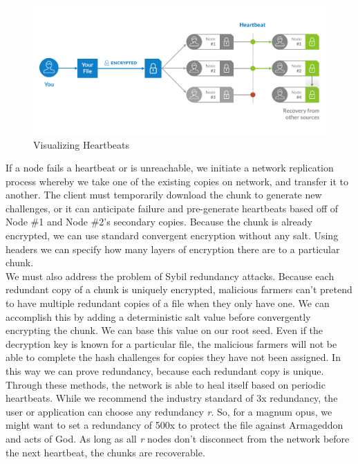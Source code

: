 \documentclass[a4paper,10pt]{article}
\begin{document}
\begin{figure}[h!]
\centering
\includegraphics[width=\linewidth]{4}
\caption{Visualizing Heartbeats}
\end{figure}

If a node fails a heartbeat or is unreachable, we initiate a network replication process whereby we take one of the existing copies on network, and transfer it to another. The client must temporarily download the chunk to generate new challenges, or it can anticipate failure and pre-generate heartbeats based off of Node \#1 and Node \#2’s secondary copies. Because the chunk is already encrypted, we can use standard convergent encryption without any salt. Using headers we can specify how many layers of encryption there are to a particular chunk. \\

We must also address the problem of Sybil redundancy attacks. Because each redundant copy of a chunk is uniquely encrypted, malicious farmers can’t pretend to have multiple redundant copies of a file when they only have one. We can accomplish this by adding a deterministic salt value before convergently encrypting the chunk. We can base this value on our root seed. Even if the decryption key is known for a particular file, the malicious farmers will not be able to complete the hash challenges for copies they have not been assigned. In this way we can prove redundancy, because each redundant copy is unique.   \\

Through these methods, the network is able to heal itself based on periodic heartbeats. While we recommend the industry standard of 3x redundancy, the user or application can choose any redundancy \textit{r}. So, for a magnum opus, we might want to set a redundancy of 500x to protect the file against Armageddon and acts of God. As long as all \textit{r} nodes don’t disconnect from the network before the next heartbeat, the chunks are recoverable. 
\end{document}

